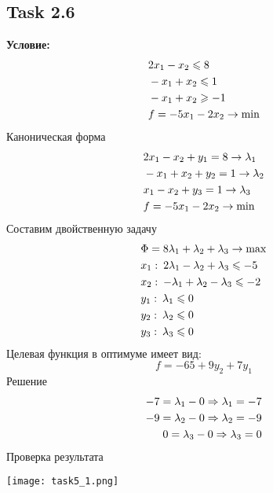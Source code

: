 \documentclass[12pt]{article}
\begin{document}
\subsection*{Task 2.6}
\textbf{Условие:}
\begin{align}
  &2x_1-x_2\leqslant8\notag\\
  &-x_1+x_2\leqslant1\\
  &-x_1+x_2\geqslant-1\notag\\
  &f=-5x_1-2x_2\to\min\notag
\end{align}
Каноническая форма
\begin{align}
  &2x_1-x_2+y_1=8\to\lambda_1\notag\\
  &-x_1+x_2+y_2=1\to\lambda_2\\
  &x_1-x_2+y_3=1\to\lambda_3\notag\\
  &f=-5x_1-2x_2\to\min\notag
\end{align}
Составим двойственную задачу
\begin{align}
 &\Phi=8\lambda_1+\lambda_2+\lambda_3\to\max\notag\\
 &x_1:\: 2\lambda_1 -\lambda_2+\lambda_3 \leqslant -5\notag\\
 &x_2:\: -\lambda_1 +\lambda_2-\lambda_3 \leqslant -2\\
 &y_1:\: \lambda_1 \leqslant 0\notag\\
 &y_2:\: \lambda_2 \leqslant 0\notag\\
 &y_3:\: \lambda_3 \leqslant 0\notag
\end{align}
Целевая функция в оптимуме имеет вид:
\begin{equation}
  f=-65+9y_2+7y_1
\end{equation}
Решение
\begin{align}
  -7=\lambda_1-0\Rightarrow \lambda_1=-7\notag\\
  -9=\lambda_2-0\Rightarrow \lambda_2=-9\\
  0=\lambda_3-0\Rightarrow \lambda_3=0\notag
\end{align}
\newpage
Проверка результата
\begin{center}\texttt{[image: task5\_1.png]}\end{center}
%
\end{document}
